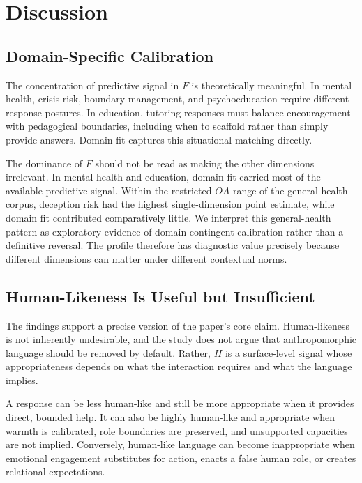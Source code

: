 \documentclass[manuscript,review,anonymous]{acmart}
\begin{document}
\section{Discussion}

\subsection{Domain-Specific Calibration}

The concentration of predictive signal in $F$ is theoretically meaningful. In mental health, crisis risk, boundary management, and psychoeducation require different response postures. In education, tutoring responses must balance encouragement with pedagogical boundaries, including when to scaffold rather than simply provide answers. Domain fit captures this situational matching directly.

The dominance of $F$ should not be read as making the other dimensions irrelevant. In mental health and education, domain fit carried most of the available predictive signal. Within the restricted $OA$ range of the general-health corpus, deception risk had the highest single-dimension point estimate, while domain fit contributed comparatively little. We interpret this general-health pattern as exploratory evidence of domain-contingent calibration rather than a definitive reversal. The profile therefore has diagnostic value precisely because different dimensions can matter under different contextual norms.

\subsection{Human-Likeness Is Useful but Insufficient}

The findings support a precise version of the paper's core claim. Human-likeness is not inherently undesirable, and the study does not argue that anthropomorphic language should be removed by default. Rather, $H$ is a surface-level signal whose appropriateness depends on what the interaction requires and what the language implies.

A response can be less human-like and still be more appropriate when it provides direct, bounded help. It can also be highly human-like and appropriate when warmth is calibrated, role boundaries are preserved, and unsupported capacities are not implied. Conversely, human-like language can become inappropriate when emotional engagement substitutes for action, enacts a false human role, or creates relational expectations.
\end{document}
